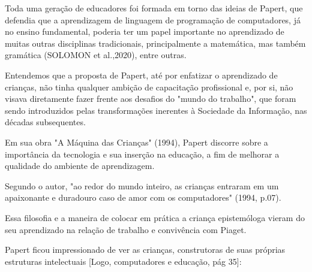 Toda uma geração de educadores foi formada em torno das ideias de Papert, que defendia que a aprendizagem de linguagem de programação de computadores, já no ensino fundamental, poderia ter um papel importante no aprendizado de muitas outras disciplinas tradicionais, principalmente a matemática, mas também gramática (SOLOMON et al.,2020), entre outras.

Entendemos que a proposta de Papert, até por enfatizar o aprendizado de crianças, não tinha qualquer ambição de capacitação profissional e, por si, não visava diretamente fazer frente aos desafios do "mundo do trabalho", que foram sendo introduzidos pelas transformações inerentes à Sociedade da Informação, nas décadas subsequentes.

Em sua obra "A Máquina das Crianças" (1994), Papert discorre sobre a importância da tecnologia e sua inserção na educação, a fim de melhorar a qualidade do ambiente de aprendizagem.


\noindent\begin{flushright}\mbox{\linespread{1}\selectfont\centering{}}\end{flushright}


Segundo o autor, "ao redor do mundo inteiro, as crianças entraram em um apaixonante e duradouro caso de amor com os computadores" (1994, p.07).

Essa filosofia e a maneira de colocar em prática a criança epistemóloga vieram do seu aprendizado na relação de trabalho e convivência com Piaget.

Papert ficou impressionado de ver as crianças, construtoras de suas próprias estruturas intelectuais [Logo, computadores e educação, pág 35]:


\noindent\begin{flushright}\mbox{\linespread{1}\selectfont\centering{}}\end{flushright}


